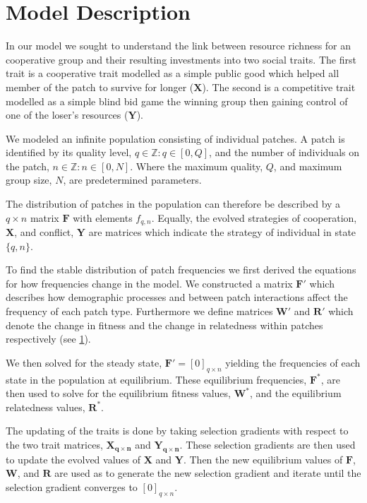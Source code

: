 \section{Model Description}\label{app:model}

In our model we sought to understand the link between resource richness for an cooperative group and their resulting investments into two social traits. The first trait is a cooperative trait modelled as a simple public good which helped all member of the patch to survive for longer ($\mathbf{X}$). The second is a competitive trait modelled as a simple blind bid game the winning group then gaining control of one of the loser's resources ($\mathbf{Y}$). 

We modeled an infinite population consisting of individual patches. A patch is identified by its quality level, $q \in \mathbb{Z} : q \in \left[ 0, Q \right]$, and the number of individuals on the patch, $n \in \mathbb{Z} : n \in \left[ 0, N \right]$. Where the maximum quality, $Q$, and maximum group size, $N$, are predetermined parameters. 

The distribution of patches in the population can therefore be described by a $q \times n$ matrix $\mathbf{F}$ with elements $f_{q,n}$. Equally, the evolved strategies of cooperation, $\mathbf{X}$, and conflict, $\mathbf{Y}$ are matrices which indicate the strategy of individual in state $\{q, n\}$. 

To find the stable distribution of patch frequencies we first derived the equations for how frequencies change in the model. We constructed a matrix $\mathbf{F}'$ which describes how demographic processes and between patch interactions affect the frequency of each patch type. Furthermore we define matrices $\mathbf{W}'$ and $\mathbf{R}'$ which denote the change in fitness and the change in relatedness within patches respectively (see \cref{app:model}).

We then solved for the steady state, $\mathbf{F}' = [0]_{q\times n}$ yielding the frequencies of each state in the population at equilibrium. These equilibrium frequencies, $\mathbf{F^{\ast}}$, are then used to solve for the equilibrium fitness values, $\mathbf{W^{\ast}}$, and the equilibrium relatedness values, $\mathbf{R^\ast}$. 

The updating of the traits is done by taking selection gradients with respect to the two trait matrices, $\mathbf{X_{q\times n}}$ and $\mathbf{Y_{q\times n}}$. These selection gradients are then used to update the evolved values of $\mathbf{X}$ and $\mathbf{Y}$. Then the new equilibrium values of $\mathbf{F}$, $\mathbf{W}$, and $\mathbf{R}$ are used as to generate the new selection gradient and iterate until the selection gradient converges to $[0]_{q\times n}$.

